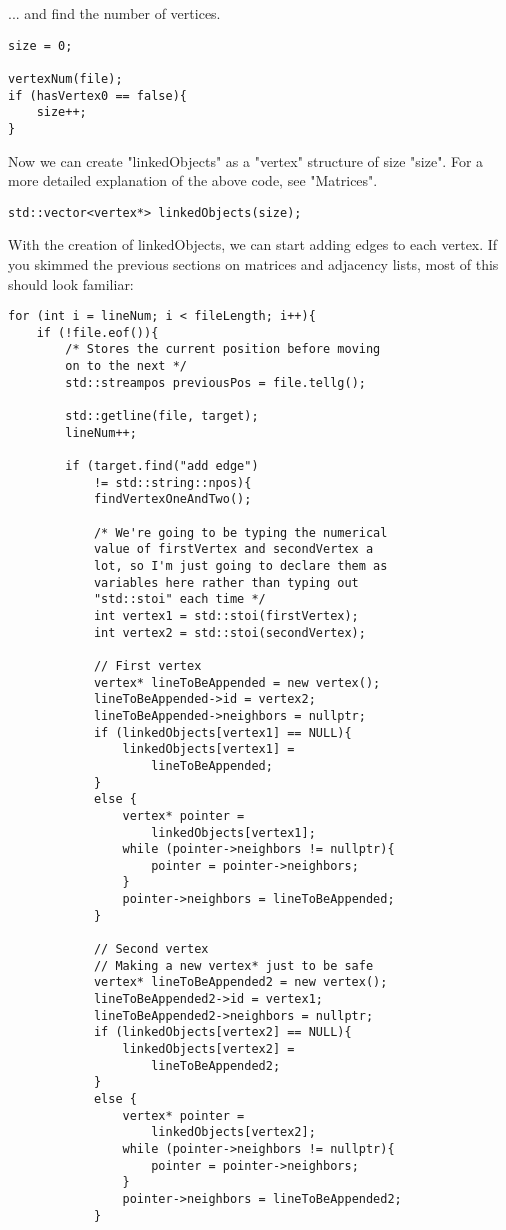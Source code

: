 \documentclass{article}
\begin{document}
... and find the number of vertices.
\begin{lstlisting}
size = 0;

vertexNum(file);
if (hasVertex0 == false){
    size++;
}
\end{lstlisting}

Now we can create "linkedObjects" as a "vertex" structure of size "size". For a more detailed explanation of the above code, see "Matrices".
\begin{lstlisting}
std::vector<vertex*> linkedObjects(size);
\end{lstlisting} 
\pagebreak
With the creation of linkedObjects, we can start adding edges to each vertex. If you skimmed the previous sections on matrices and adjacency lists, most of this should look familiar:
\begin{lstlisting}
for (int i = lineNum; i < fileLength; i++){
    if (!file.eof()){
        /* Stores the current position before moving 
        on to the next */
        std::streampos previousPos = file.tellg();

        std::getline(file, target);
        lineNum++;

        if (target.find("add edge") 
            != std::string::npos){
            findVertexOneAndTwo();

            /* We're going to be typing the numerical 
            value of firstVertex and secondVertex a 
            lot, so I'm just going to declare them as 
            variables here rather than typing out 
            "std::stoi" each time */
            int vertex1 = std::stoi(firstVertex);
            int vertex2 = std::stoi(secondVertex);

            // First vertex
            vertex* lineToBeAppended = new vertex();
            lineToBeAppended->id = vertex2;
            lineToBeAppended->neighbors = nullptr;
            if (linkedObjects[vertex1] == NULL){
                linkedObjects[vertex1] = 
                    lineToBeAppended;
            }
            else {
                vertex* pointer = 
                    linkedObjects[vertex1];
                while (pointer->neighbors != nullptr){
                    pointer = pointer->neighbors;
                }
                pointer->neighbors = lineToBeAppended;
            }

            // Second vertex
            // Making a new vertex* just to be safe
            vertex* lineToBeAppended2 = new vertex();
            lineToBeAppended2->id = vertex1;
            lineToBeAppended2->neighbors = nullptr;
            if (linkedObjects[vertex2] == NULL){
                linkedObjects[vertex2] = 
                    lineToBeAppended2;
            }
            else {
                vertex* pointer = 
                    linkedObjects[vertex2];
                while (pointer->neighbors != nullptr){
                    pointer = pointer->neighbors;
                }
                pointer->neighbors = lineToBeAppended2;
            }
                        

\end{lstlisting}
\end{document}
